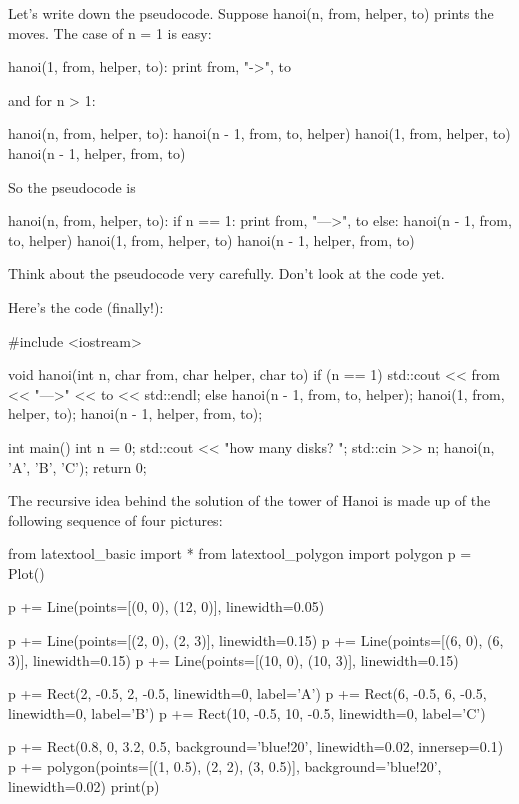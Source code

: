 Let's write down the pseudocode. Suppose hanoi(n, from,
helper, to) prints the moves. The case of n = 1 is easy:

\begin{consolethree}
hanoi(1, from, helper, to):
    print from, "->", to
\end{consolethree}

and for n > 1:

\begin{consolethree}
hanoi(n, from, helper, to):
    hanoi(n - 1, from, to, helper)
    hanoi(1, from, helper, to)
    hanoi(n - 1, helper, from, to)
\end{consolethree}

So the pseudocode is

\begin{consolethree}
hanoi(n, from, helper, to):
    if n == 1:
        print from, "--->", to
    else:
        hanoi(n - 1, from, to, helper)
        hanoi(1, from, helper, to)
        hanoi(n - 1, helper, from, to)
\end{consolethree}

Think about the pseudocode very carefully. Don't look at
the code yet.


Here's the code (finally!):

\begin{consolethree}[escapeinside=||]
#include <iostream>

void hanoi(int n, char from, char helper, char to)
{
    if (n == 1)
    {
        std::cout << from << "--->" << to
                  << std::endl;
    }
    else
    {
        hanoi(n - 1, from, to, helper);
        hanoi(1, from, helper, to);
        hanoi(n - 1, helper, from, to);
    }
}

int main()
{
    int n = 0;
    std::cout << "how many disks? ";
    std::cin >> n;
    hanoi(n, 'A', 'B', 'C');
    return 0;
}
\end{consolethree}


The recursive idea behind the solution of the tower
of Hanoi is made up of the following sequence of four pictures:

\begin{python}
from latextool_basic import *
from latextool_polygon import polygon
p = Plot()

p += Line(points=[(0, 0), (12, 0)], linewidth=0.05)

p += Line(points=[(2, 0), (2, 3)], linewidth=0.15)
p += Line(points=[(6, 0), (6, 3)], linewidth=0.15)
p += Line(points=[(10, 0), (10, 3)], linewidth=0.15)

p += Rect(2, -0.5, 2, -0.5, linewidth=0, label='A')
p += Rect(6, -0.5, 6, -0.5, linewidth=0, label='B')
p += Rect(10, -0.5, 10, -0.5, linewidth=0, label='C')

p += Rect(0.8, 0, 3.2, 0.5, background='blue!20', linewidth=0.02, innersep=0.1)  
p += polygon(points=[(1, 0.5), (2, 2), (3, 0.5)], background='blue!20', linewidth=0.02)
print(p)
\end{python}

